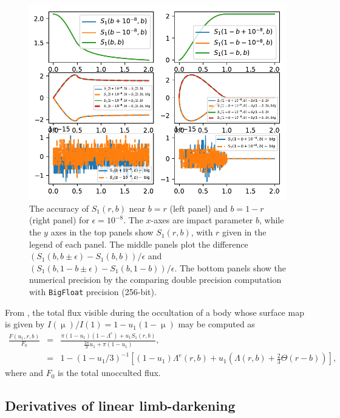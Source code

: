 \documentclass[modern]{aastex61}
\begin{document}
\begin{figure}\label{s2_machine}
    \begin{centering}
    \includegraphics[width=\linewidth]{figures/julia/s2_machine.pdf}
    \caption{The accuracy of $S_1(r,b)$ near $b=r$ (left panel) and
    $b=1-r$ (right panel) for $\epsilon = 10^{-8}$. The $x$-axes are impact parameter $b$,
    while the $y$ axes in the top panels show $S_1(r,b)$, with $r$
    given in the legend of each panel. The middle panels plot
    the difference $(S_1(b,b\pm\epsilon)-S_1(b,b))/\epsilon$
    and $(S_1(b,1-b\pm\epsilon)-S_1(b,1-b))/\epsilon$. The bottom
    panels show the numerical precision by the comparing double precision
    computation with \texttt{BigFloat} precision (256-bit). }
    \end{centering}
\end{figure}

From \citet{MandelAgol2002}, the total flux visible during the occultation of a
body whose surface map is given by $I(\upmu)/I(1) = 1 - u_1(1 - \upmu)$ may be computed
as
\begin{eqnarray}
\frac{F(u_1,r,b)}{F_0} &=& \frac{\pi(1-u_1)(1-\Lambda^e)+ u_1 S_1(r,b)}{\frac{2\pi}{3}u_1 + \pi(1-u_1)},\\
&=& 1-(1-u_1/3)^{-1}\left[(1-u_1)\Lambda^e(r,b) + u_1\left(\Lambda(r,b)+\tfrac{2}{3}\Theta(r-b)\right)\right],
\end{eqnarray}
where
and $F_0$ is the total unocculted flux.  %

\subsection{Derivatives of linear limb-darkening}
\end{document}
